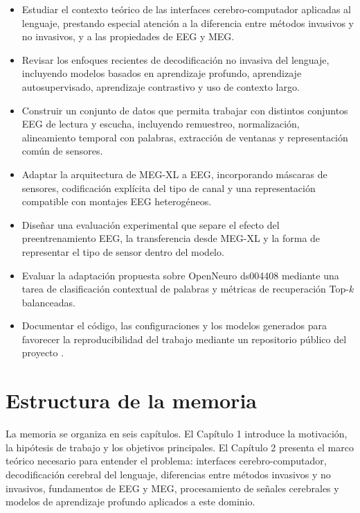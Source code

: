 \begin{itemize}
    \item Estudiar el contexto teórico de las interfaces cerebro-computador aplicadas al lenguaje, prestando especial atención a la diferencia entre métodos invasivos y no invasivos, y a las propiedades de EEG y MEG.

    \item Revisar los enfoques recientes de decodificación no invasiva del lenguaje, incluyendo modelos basados en aprendizaje profundo, aprendizaje autosupervisado, aprendizaje contrastivo y uso de contexto largo.

    \item Construir un conjunto de datos que permita trabajar con distintos conjuntos EEG de lectura y escucha, incluyendo remuestreo, normalización, alineamiento temporal con palabras, extracción de ventanas y representación común de sensores.

    \item Adaptar la arquitectura de MEG-XL a EEG, incorporando máscaras de sensores, codificación explícita del tipo de canal y una representación compatible con montajes EEG heterogéneos.

    \item Diseñar una evaluación experimental que separe el efecto del preentrenamiento EEG, la transferencia desde MEG-XL y la forma de representar el tipo de sensor dentro del modelo.

    \item Evaluar la adaptación propuesta sobre OpenNeuro ds004408 mediante una tarea de clasificación contextual de palabras y métricas de recuperación Top-$k$ balanceadas.

    \item Documentar el código, las configuraciones y los modelos generados para favorecer la reproducibilidad del trabajo mediante un repositorio público del proyecto \cite{scrabrain_github}.
\end{itemize}

\section{Estructura de la memoria}

La memoria se organiza en seis capítulos. El Capítulo 1 introduce la motivación, la hipótesis de trabajo y los objetivos principales. El Capítulo 2 presenta el marco teórico necesario para entender el problema: interfaces cerebro-computador, decodificación cerebral del lenguaje, diferencias entre métodos invasivos y no invasivos, fundamentos de EEG y MEG, procesamiento de señales cerebrales y modelos de aprendizaje profundo aplicados a este dominio.

